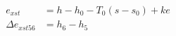 

\item[c)] 
    \begin{align*}
        e_{xst} &= h - h_0 - T_0 (s - s_0) + ke \\
        \Delta e_{xst56} &= h_6 - h_5
    \end{align*}